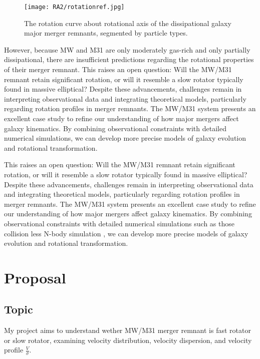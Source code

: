 \documentclass[twocolumn, trackchanges]{aastex7}
\begin{document}
\begin{figure}
  \centering
  \texttt{[image: RA2/rotationref.jpg]}
  \caption{The rotation curve about rotational axis of the dissipational galaxy major merger remnants, segmented by particle types. \citep{Cox_2006}}
  \label{fig:rotationref}
\end{figure}
However, because MW and M31 are only moderately gas-rich and only partially dissipational, there are insufficient predictions regarding the rotational properties of their merger remnant. This raises an open question: Will the MW/M31 remnant retain significant rotation, or will it resemble a slow rotator typically found in massive elliptical? Despite these advancements, challenges remain in interpreting observational data and integrating theoretical models, particularly regarding rotation profiles in merger remnants. The MW/M31 system presents an excellent case study to refine our understanding of how major mergers affect galaxy kinematics. By combining observational constraints with detailed numerical simulations, we can develop more precise models of galaxy evolution and rotational transformation.

This raises an open question: Will the MW/M31 remnant retain significant rotation, or will it resemble a slow rotator typically found in massive elliptical? Despite these advancements, challenges remain in interpreting observational data and integrating theoretical models, particularly regarding rotation profiles in merger remnants. The MW/M31 system presents an excellent case study to refine our understanding of how major mergers affect galaxy kinematics. By combining observational constraints with detailed numerical simulations such as those collision less  N-body simulation \citep{van_der_Marel_2012}, we can develop more precise models of galaxy evolution and rotational transformation.

\section{Proposal} 
\subsection{Topic} 
My project aims to understand wether MW/M31 merger remnant is fast rotator or slow rotator, examining velocity distribution, velocity dispersion, and velocity profile $\frac{V}{\sigma}$.
\end{document}
